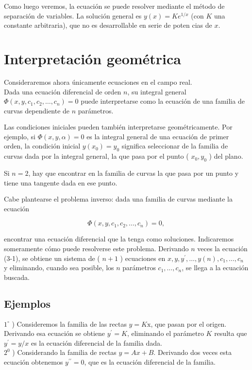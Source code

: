 \documentclass[10pt]{article}
\theoremstyle{plain}
\theoremstyle{definition}
\theoremstyle{remark}
\begin{document}
Como luego veremos, la ecuación se puede resolver mediante el método de separación de variables. La solución general es $y(x)=K e^{1 / x}$ (con $K$ una constante arbitraria), que no es desarrollable en serie de poten cias de $x$.

\section{Interpretación geométrica}
Consideraremos ahora únicamente ecuaciones en el campo real.\\
Dada una ecuación diferencial de orden $n$, su integral general $\Phi\left(x, y, c_{1}, c_{2}, \ldots, c_{n}\right)=0$ puede interpretarse como la ecuación de una familia de curvas dependiente de $n$ parámetros.

Las condiciones iniciales pueden también interpretarse geométricamente. Por ejemplo, si $\Phi(x, y, \alpha)=0$ es la integral general de una ecuación de primer orden, la condición inicial $y\left(x_{0}\right)=y_{0}$ significa seleccionar de la familia de curvas dada por la integral general, la que pasa por el punto ( $x_{0}, y_{0}$ ) del plano.

Si $n=2$, hay que encontrar en la familia de curvas la que pasa por un punto y tiene una tangente dada en ese punto.

Cabe plantearse el problema inverso: dada una familia de curvas mediante la ecuación


\begin{equation*}
\Phi\left(x, y, c_{1}, c_{2}, \ldots, c_{n}\right)=0, \tag{3-1}
\end{equation*}


encontrar una ecuación diferencial que la tenga como soluciones. Indicaremos someramente cómo puede resolverse este problema. Derivando $n$ veces la ecuación (3-1), se obtiene un sistema de ( $n+1$ ) ecuaciones en $x, y, y^{\prime}, \ldots, y(n), c_{1}, \ldots, c_{n}$ y eliminando, cuando sea posible, los $n$ parámetros $c_{1}, \ldots, c_{n}$, se llega a la ecuación buscada.

\subsection*{Ejemplos}
$1^{\circ}$ ) Consideremos la familia de las rectas $y=K \mathrm{x}$, que pasan por el origen. Derivando esa ecuación se obtiene $y^{\prime}=K$, eliminando el parámetro $K$ resulta que $y^{\prime}=y / x$ es la ecuación diferencial de la familia dada.\\
$2^{0}$ ) Considerando la familia de rectas $y=A x+B$. Derivando dos veces esta ecuación obtenemos $y^{\prime \prime}=0$, que es la ecuación diferencial de la familia.
\end{document}
